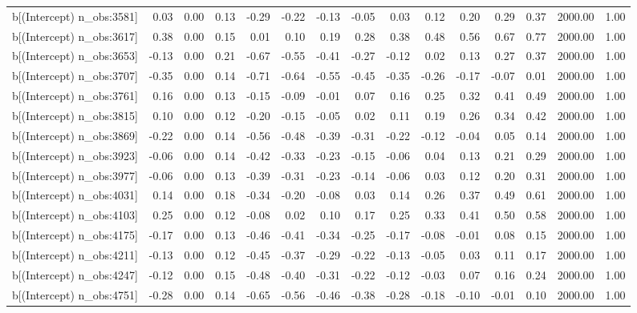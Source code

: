 \begin{table}[ht]
\begin{tabular}{rrrrrrrrrrrrrrr}
  b[(Intercept) n\_obs:3581] & 0.03 & 0.00 & 0.13 & -0.29 & -0.22 & -0.13 & -0.05 & 0.03 & 0.12 & 0.20 & 0.29 & 0.37 & 2000.00 & 1.00 \\ 
  b[(Intercept) n\_obs:3617] & 0.38 & 0.00 & 0.15 & 0.01 & 0.10 & 0.19 & 0.28 & 0.38 & 0.48 & 0.56 & 0.67 & 0.77 & 2000.00 & 1.00 \\ 
  b[(Intercept) n\_obs:3653] & -0.13 & 0.00 & 0.21 & -0.67 & -0.55 & -0.41 & -0.27 & -0.12 & 0.02 & 0.13 & 0.27 & 0.37 & 2000.00 & 1.00 \\ 
  b[(Intercept) n\_obs:3707] & -0.35 & 0.00 & 0.14 & -0.71 & -0.64 & -0.55 & -0.45 & -0.35 & -0.26 & -0.17 & -0.07 & 0.01 & 2000.00 & 1.00 \\ 
  b[(Intercept) n\_obs:3761] & 0.16 & 0.00 & 0.13 & -0.15 & -0.09 & -0.01 & 0.07 & 0.16 & 0.25 & 0.32 & 0.41 & 0.49 & 2000.00 & 1.00 \\ 
  b[(Intercept) n\_obs:3815] & 0.10 & 0.00 & 0.12 & -0.20 & -0.15 & -0.05 & 0.02 & 0.11 & 0.19 & 0.26 & 0.34 & 0.42 & 2000.00 & 1.00 \\ 
  b[(Intercept) n\_obs:3869] & -0.22 & 0.00 & 0.14 & -0.56 & -0.48 & -0.39 & -0.31 & -0.22 & -0.12 & -0.04 & 0.05 & 0.14 & 2000.00 & 1.00 \\ 
  b[(Intercept) n\_obs:3923] & -0.06 & 0.00 & 0.14 & -0.42 & -0.33 & -0.23 & -0.15 & -0.06 & 0.04 & 0.13 & 0.21 & 0.29 & 2000.00 & 1.00 \\ 
  b[(Intercept) n\_obs:3977] & -0.06 & 0.00 & 0.13 & -0.39 & -0.31 & -0.23 & -0.14 & -0.06 & 0.03 & 0.12 & 0.20 & 0.31 & 2000.00 & 1.00 \\ 
  b[(Intercept) n\_obs:4031] & 0.14 & 0.00 & 0.18 & -0.34 & -0.20 & -0.08 & 0.03 & 0.14 & 0.26 & 0.37 & 0.49 & 0.61 & 2000.00 & 1.00 \\ 
  b[(Intercept) n\_obs:4103] & 0.25 & 0.00 & 0.12 & -0.08 & 0.02 & 0.10 & 0.17 & 0.25 & 0.33 & 0.41 & 0.50 & 0.58 & 2000.00 & 1.00 \\ 
  b[(Intercept) n\_obs:4175] & -0.17 & 0.00 & 0.13 & -0.46 & -0.41 & -0.34 & -0.25 & -0.17 & -0.08 & -0.01 & 0.08 & 0.15 & 2000.00 & 1.00 \\ 
  b[(Intercept) n\_obs:4211] & -0.13 & 0.00 & 0.12 & -0.45 & -0.37 & -0.29 & -0.22 & -0.13 & -0.05 & 0.03 & 0.11 & 0.17 & 2000.00 & 1.00 \\ 
  b[(Intercept) n\_obs:4247] & -0.12 & 0.00 & 0.15 & -0.48 & -0.40 & -0.31 & -0.22 & -0.12 & -0.03 & 0.07 & 0.16 & 0.24 & 2000.00 & 1.00 \\ 
  b[(Intercept) n\_obs:4751] & -0.28 & 0.00 & 0.14 & -0.65 & -0.56 & -0.46 & -0.38 & -0.28 & -0.18 & -0.10 & -0.01 & 0.10 & 2000.00 & 1.00 \\ 

\end{tabular}
\end{table}
